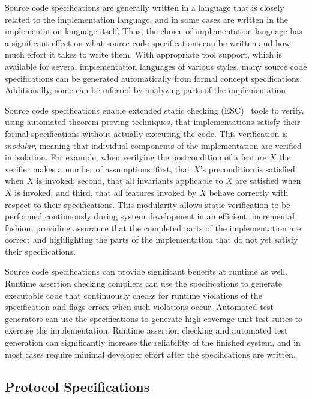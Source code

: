 Source code specifications are generally written in a language that is
closely related to the implementation language, and in some cases are
written in the implementation language itself. Thus, the choice of
implementation language has a significant effect on what source code
specifications can be written and how much effort it takes to write
them. With appropriate tool support, which is available for several
implementation languages of various styles, many source code
specifications can be generated automatically from formal concept
specifications. Additionally, some can be inferred by analyzing parts
of the implementation.

Source code specifications enable extended static checking
(ESC)~\cite{ESC98} tools to verify, using automated theorem proving
techniques, that implementations satisfy their formal specifications
without actually executing the code. This verification is
\emph{modular}, meaning that individual components of the
implementation are verified in isolation. For example, when verifying
the postcondition of a feature $X$ the verifier makes a number of
assumptions: first, that $X$'s precondition is satisfied when $X$ is
invoked; second, that all invariants applicable to $X$ are satisfied
when $X$ is invoked; and third, that all features invoked by $X$
behave correctly with respect to their specifications. This modularity
allows static verification to be performed continuously during system
development in an efficient, incremental fashion, providing assurance
that the completed parts of the implementation are correct and
highlighting the parts of the implementation that do not yet satisfy
their specifications.

Source code specifications can provide significant benefits at runtime
as well. Runtime assertion checking compilers can use the
specifications to generate executable code that continuously checks
for runtime violations of the specification and flags errors when such
violations occur. Automated test generators can use the specifications
to generate high-coverage unit test suites to exercise the
implementation. Runtime assertion checking and automated test
generation can significantly increase the reliability of the finished
system, and in most cases require minimal developer effort after the
specifications are written.

\subsection{Protocol Specifications}

